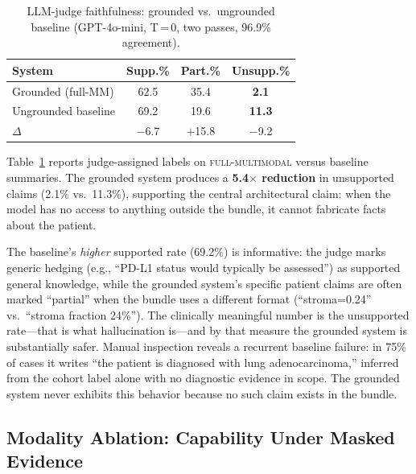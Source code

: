 \documentclass[11pt]{article}
\begin{document}
\begin{table}[h]
\centering
\small
\begin{tabular}{lccc}
\toprule
\textbf{System} & \textbf{Supp.\%} & \textbf{Part.\%} & \textbf{Unsupp.\%} \\
\midrule
Grounded (full-MM) & 62.5 & 35.4 & \textbf{2.1} \\
Ungrounded baseline & 69.2 & 19.6 & \textbf{11.3} \\
\midrule
$\Delta$ & $-$6.7 & $+$15.8 & $-$9.2 \\
\bottomrule
\end{tabular}
\caption{LLM-judge faithfulness: grounded vs.\ ungrounded baseline (GPT-4o-mini, T\,=\,0, two passes, 96.9\% agreement).}
\label{tab:faithfulness}
\end{table}

Table~\ref{tab:faithfulness} reports judge-assigned labels on \textsc{full-multimodal} versus baseline summaries. The grounded system produces a \textbf{5.4$\times$ reduction} in unsupported claims (2.1\% vs.\ 11.3\%), supporting the central architectural claim: when the model has no access to anything outside the bundle, it cannot fabricate facts about the patient.

The baseline's \emph{higher} supported rate (69.2\%) is informative: the judge marks generic hedging (e.g., ``PD-L1 status would typically be assessed'') as supported general knowledge, while the grounded system's specific patient claims are often marked ``partial'' when the bundle uses a different format (``stroma=0.24'' vs.\ ``stroma fraction 24\%''). The clinically meaningful number is the unsupported rate—that is what hallucination is—and by that measure the grounded system is substantially safer. Manual inspection reveals a recurrent baseline failure: in 75\% of cases it writes ``the patient is diagnosed with lung adenocarcinoma,'' inferred from the cohort label alone with no diagnostic evidence in scope. The grounded system never exhibits this behavior because no such claim exists in the bundle.

\subsection{Modality Ablation: Capability Under Masked Evidence}
\end{document}
